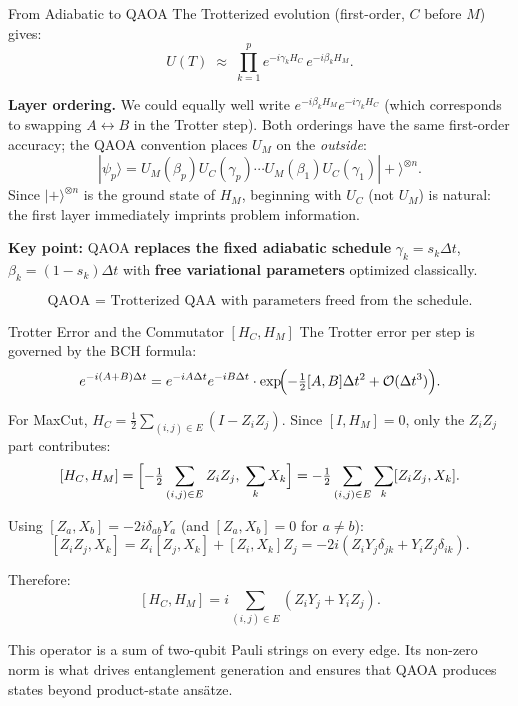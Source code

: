 \documentclass{beamer}
\begin{document}
\begin{frame}{From Adiabatic to QAOA}
The Trotterized evolution (first-order, $C$ before $M$) gives:
\[
U(T) \;\approx\; \prod_{k=1}^p e^{-i\gamma_k H_C}\,e^{-i\beta_k H_M}.
\]

\textbf{Layer ordering.}  We could equally well write
$e^{-i\beta_k H_M}e^{-i\gamma_k H_C}$ (which corresponds to
swapping $A\leftrightarrow B$ in the Trotter step).
Both orderings have the same first-order accuracy; the QAOA
convention places $U_M$ on the \emph{outside}:
\[
|\psi_p\rangle = U_M(\beta_p)U_C(\gamma_p)\cdots U_M(\beta_1)U_C(\gamma_1)|+\rangle^{\otimes n}.
\]
Since $|+\rangle^{\otimes n}$ is the ground state of $H_M$, beginning
with $U_C$ (not $U_M$) is natural: the first layer immediately
imprints problem information.

\medskip
\textbf{Key point:} QAOA \textbf{replaces the fixed adiabatic schedule}
$\gamma_k = s_k\Delta t$, $\beta_k = (1-s_k)\Delta t$ with
\textbf{free variational parameters} optimized classically.

\[
\boxed{
\text{QAOA = Trotterized QAA with parameters freed from the schedule.}
}
\]
\end{frame}


\begin{frame}{Trotter Error and the Commutator $[H_C, H_M]$}
The Trotter error per step is governed by the BCH formula:
\[
e^{-i(A+B)\Delta t}
= e^{-iA\Delta t}e^{-iB\Delta t}
\cdot\exp\!\Bigl(-\tfrac{1}{2}[A,B]\Delta t^2 + \mathcal{O}(\Delta t^3)\Bigr).
\]

For MaxCut, $H_C = \tfrac{1}{2}\sum_{(i,j)\in E}(I-Z_iZ_j)$.  Since
$[I, H_M]=0$, only the $Z_iZ_j$ part contributes:
\[
[H_C,H_M]
= \Bigl[-\tfrac{1}{2}\sum_{(i,j)\in E}Z_iZ_j,\;\sum_k X_k\Bigr]
= -\tfrac{1}{2}\sum_{(i,j)\in E}\sum_k [Z_iZ_j, X_k].
\]

Using $[Z_a,X_b] = -2i\delta_{ab}Y_a$ (and $[Z_a,X_b]=0$ for $a\neq b$):
\[
[Z_iZ_j,X_k] = Z_i[Z_j,X_k]+[Z_i,X_k]Z_j
= -2i(Z_iY_j\delta_{jk}+Y_iZ_j\delta_{ik}).
\]

Therefore:
\[
[H_C,H_M] = i\sum_{(i,j)\in E}(Z_iY_j + Y_iZ_j).
\]

This operator is a sum of two-qubit Pauli strings on every edge.
Its non-zero norm is what drives entanglement generation and
ensures that QAOA produces states beyond product-state ansätze.
\end{frame}

\end{document}
